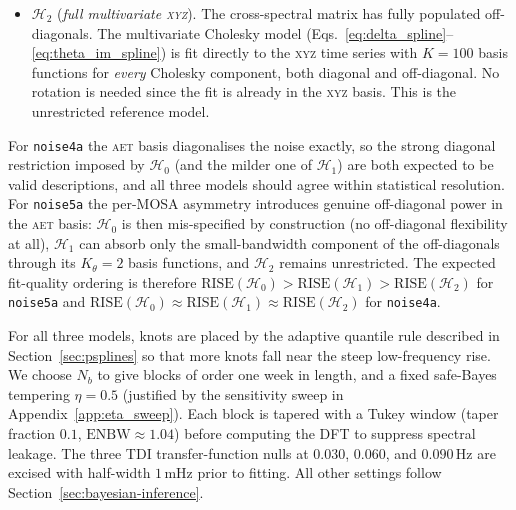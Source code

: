\documentclass[%
	reprint,
	nofootinbib,
	amsmath,
	amssymb,
	aps,
]{revtex4-2}
\newcommand{\AET}{\textsc{aet}\xspace}
\newcommand{\XYZ}{\textsc{xyz}\xspace}
\begin{document}
\begin{itemize}
		between the strictly diagonal $\mathcal{H}_{0}$ (off-diagonal
		data discarded, no cross-power) and the unrestricted
		$\mathcal{H}_{2}$: it sees the off-diagonal data but is
		biased toward a near-diagonal solution, so it can reveal
		smooth cross-power when present without introducing
		spurious structure when it is not. The posterior spectral matrix is
		rotated back to the \XYZ basis for diagnostics.
		\item $\mathcal{H}_{2}$ (\emph{full multivariate \XYZ}).
		The cross-spectral matrix has fully populated off-diagonals.
		The multivariate Cholesky model
		(Eqs.~\ref{eq:delta_spline}--\ref{eq:theta_im_spline})
		is fit directly to the \XYZ time series with $K=100$ basis
		functions for \emph{every} Cholesky component, both diagonal and
		off-diagonal. No rotation is
		needed since the fit is already in the \XYZ basis. This is
		the unrestricted reference model.
	\end{itemize}
	For \texttt{noise4a} the \AET basis diagonalises the noise
	exactly, so the strong diagonal restriction imposed by
	$\mathcal{H}_{0}$ (and the milder one of $\mathcal{H}_{1}$)
	are both expected to be valid descriptions, and all three
	models should agree within statistical resolution. For
	\texttt{noise5a} the per-MOSA asymmetry introduces genuine
	off-diagonal power in the \AET basis: $\mathcal{H}_{0}$ is
	then mis-specified by construction (no off-diagonal flexibility
	at all), $\mathcal{H}_{1}$ can absorb only the small-bandwidth
	component of the off-diagonals through its $K_{\theta}=2$
	basis functions, and $\mathcal{H}_{2}$ remains unrestricted. The expected
	fit-quality ordering is therefore
	$\mathrm{RISE}(\mathcal{H}_{0})\!>\!\mathrm{RISE}(\mathcal{H}_{1})\!>\!\mathrm{RISE}(\mathcal{H}_{2})$
	for \texttt{noise5a} and
	$\mathrm{RISE}(\mathcal{H}_{0})\!\approx\!\mathrm{RISE}(\mathcal{H}_{1})\!\approx\!\mathrm{RISE}(\mathcal{H}_{2})$
	for \texttt{noise4a}.

	For all three models, knots are placed by the adaptive quantile rule
	described in Section~\ref{sec:psplines} so that more knots fall near
	the steep low-frequency rise. We choose $N_{b}$ to give blocks of
	order one week in length, and a fixed safe-Bayes tempering
	$\eta=0.5$ (justified by the sensitivity sweep in
	Appendix~\ref{app:eta_sweep}). Each block is tapered with a Tukey window
	(taper fraction $0.1$, $\mathrm{ENBW}\approx1.04$) before
	computing the DFT to suppress spectral leakage. The three TDI
	transfer-function nulls at $0.030$, $0.060$, and $0.090$\,Hz are
	excised with half-width $1$\,mHz prior to fitting. All other settings
	follow Section~\ref{sec:bayesian-inference}.
\end{document}
